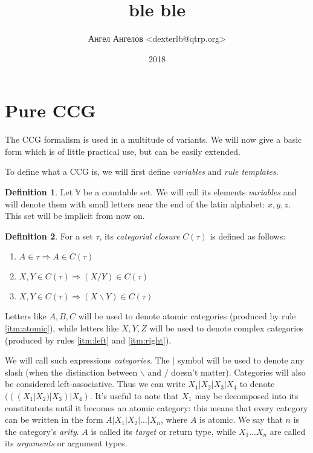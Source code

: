 \documentclass[12pt]{extarticle}
\title{ble ble}
\author{Ангел Ангелов <dexterlb@qtrp.org>}
\date{2018}
\theoremstyle{definition} \newtheorem{defn}{Definition}
\newcommand{\lc}{\backslash}
\newcommand{\rc}{/}
\newcommand{\mc}{|}
\begin{document}

\section{Pure CCG}
The CCG formalism is used in a multitude of variants. We will now give a basic
form which is of little practical use, but can be easily extended.

To define what a CCG is, we will first define \emph{variables} and
\emph{rule templates}.

\begin{defn}
    Let $\mathbb{V}$ be a countable set. We will call its elements
    \emph{variables} and will denote them with small letters near the end
    of the latin alphabet: $x, y, z$. This set will be implicit from now on.
\end{defn}

\begin{defn}
    For a set $\tau$, its \emph{categorial closure} $C(\tau)$ is defined as follows:
    \begin{enumerate}
        \item \label{itm:atomic} $A \in \tau \Rightarrow A \in C(\tau)$
        \item \label{itm:right}  $X, Y \in C(\tau) \Rightarrow (X \rc Y) \in C(\tau)$
        \item \label{itm:left}   $X, Y \in C(\tau) \Rightarrow (X \lc Y) \in C(\tau)$
    \end{enumerate}

    Letters like $A, B, C$ will be used to denote atomic categories (produced
    by rule \ref{itm:atomic}), while letters like $X, Y, Z$ will be used to
    denote complex categories (produced by rules \ref{itm:left} and \ref{itm:right}).

    We will call such expressions \emph{categories}. The $\mc$ symbol will be
    used to denote any slash (when the distinction between $\lc$ and $\rc$
    doesn't matter). Categories will also be considered left-associative.
    Thus we can write $X_1 \mc X_2 \mc X_3 \mc X_4$ to denote
    $(((X_1 \mc X_2) \mc X_3) \mc X_4)$. It's useful to note that $X_1$ may
    be decomposed into its constitutents until it becomes an atomic category:
    this means that every category can be written in the form
    $A \mc X_1 \mc X_2 \mc ... \mc X_n$, where $A$ is atomic. We say that
    $n$ is the category's \emph{arity}. $A$ is called its \emph{target} or
    return type, while
    $X_1 ... X_n$ are called its \emph{arguments} or argument types.
\end{defn}
\end{document}
